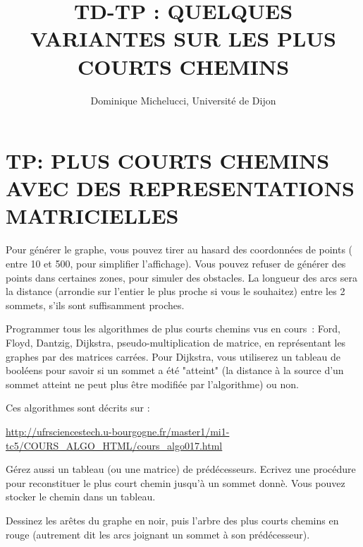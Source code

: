 \documentclass[a4paper]{article}
\begin{document}
\title{\bf TD-TP : QUELQUES VARIANTES SUR LES PLUS COURTS CHEMINS}
\author{Dominique Michelucci, Universit\'e de Dijon}
\date{}

\maketitle

{
\section{TP: PLUS COURTS CHEMINS AVEC DES REPRESENTATIONS MATRICIELLES}
Pour g\'en\'erer le graphe, vous pouvez tirer au hasard des coordonn\'ees de points (
entre 10 et 500, pour simplifier l'affichage).
Vous pouvez refuser de g\'en\'erer des points dans certaines zones, pour simuler des obstacles. 
La longueur des arcs sera
la distance (arrondie sur l'entier  le plus proche si vous le souhaitez) entre les 2 sommets, 
s'ils sont suffisamment proches.

Programmer tous les algorithmes de plus courts chemins vus en cours~:
Ford, Floyd, Dantzig, Dijkstra, pseudo-multiplication de matrice,
en repr\'esentant les graphes par des matrices carr\'ees.
Pour Dijkstra, vous utiliserez un tableau de bool\'eens pour 
savoir si un sommet a \'et\'e "atteint" (la distance \`a la source d'un sommet atteint ne peut plus \^etre modifi\'ee par l'algorithme) ou non. 

Ces algorithmes sont d\'ecrits sur :

\url{http://ufrsciencestech.u-bourgogne.fr/master1/mi1-tc5/COURS_ALGO_HTML/cours_algo017.html}

G\'erez aussi un tableau (ou une matrice) de pr\'ed\'ecesseurs.
Ecrivez une proc\'edure pour reconstituer le plus court chemin jusqu'\`a un sommet donn\`e. 
Vous pouvez stocker le chemin dans un tableau.

Dessinez les ar\^etes du graphe en noir, puis
l'arbre des plus courts chemins en rouge 
(autrement dit les arcs joignant un sommet \`a son pr\'ed\'ecesseur).

}
\end{document}
